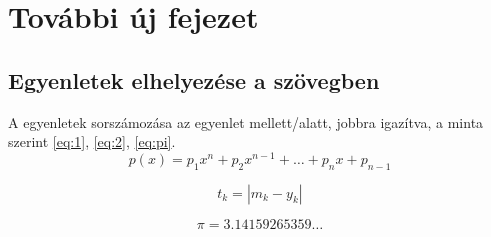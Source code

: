 \chapter{További új fejezet}

\thispagestyle{fancy}
\pagestyle{fancy}


\section{Egyenletek elhelyezése a szövegben}

A egyenletek sorszámozása az egyenlet mellett/alatt, jobbra igazítva, a minta szerint \ref{eq:1}, \ref{eq:2}, \ref{eq:pi}.
\begin{equation}\label{eq:1}
p(x)=p_1 x^n+p_2 x^{n-1} + \dots + p_n x+ p_{n-1}
\end{equation}


\begin{equation}\label{eq:2}
t_k=|m_k-y_k |
\end{equation}

\begin{equation}\label{eq:pi}
\pi=3.14159265359\dots
\end{equation}
